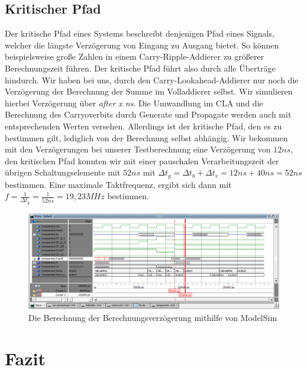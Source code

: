 \documentclass{report}
\begin{document}
\subsection{Kritischer Pfad}

Der kritische Pfad eines Systems beschreibt denjenigen Pfad eines Signals, welcher die längste Verzögerung von Eingang zu Ausgang bietet. So können beispielsweise große Zahlen in einem Carry-Ripple-Addierer zu größerer Berechnungszeit führen. Der kritische Pfad führt also durch alle Überträge hindurch. Wir haben bei uns, durch den Carry-Lookahead-Addierer nur noch die Verzögerung der Berechnung der Summe im Volladdierer selbst. Wir simulieren hierbei Verzögerung über \textit{after x ns}. Die Umwandlung im CLA und die Berechnung des Carryoverbits durch Generate und Propagate werden auch mit entsprechenden Werten versehen. Allerdings ist der kritische Pfad, den es zu bestimmen gilt, lediglich von der Berechnung selbst abhängig. Wir bekommen mit den Verzögerungen bei unserer Testberechnung eine Verzögerung von $12ns$, den kritischen Pfad konnten wir mit einer pauschalen Verarbeitungszeit der übrigen Schaltungselemente mit $52ns$ mit $\Delta t_g = \Delta t_b + \Delta t_v = 12ns + 40ns = 52ns$ bestimmen. Eine maximale Taktfrequenz, ergibt sich dann mit $f = \frac{1}{\Delta t_g} = \frac{1}{52ns} = 19,23MHz$ bestimmen.

\begin{figure}[h]
  \centering
  \includegraphics[width=\textwidth]{../assets/images/DIHA/simuBtimev2.PNG}
  \caption{Die Berechnung der Berechnungsverzögerung mithilfe von ModelSim}
  \label{fig:simuBtime}
\end{figure}




\section{Fazit}
\label{sec:fazit-1}
\end{document}
